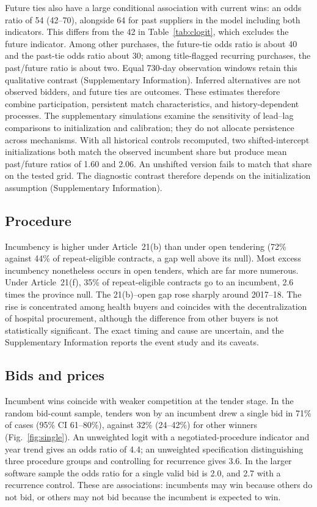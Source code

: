 \documentclass[pdflatex,sn-apa]{sn-jnl}
\begin{document}
Future ties also have a large conditional association with current wins: an odds ratio of 54 (42--70), alongside 64 for past suppliers in the model including both indicators. This differs from the 42 in Table~\ref{tab:clogit}, which excludes the future indicator. Among other purchases, the future-tie odds ratio is about 40 and the past-tie odds ratio about 30; among title-flagged recurring purchases, the past/future ratio is about two. Equal 730-day observation windows retain this qualitative contrast (Supplementary Information). Inferred alternatives are not observed bidders, and future ties are outcomes. These estimates therefore combine participation, persistent match characteristics, and history-dependent processes. The supplementary simulations examine the sensitivity of lead--lag comparisons to initialization and calibration; they do not allocate persistence across mechanisms. With all historical controls recomputed, two shifted-intercept initializations both match the observed incumbent share but produce mean past/future ratios of 1.60 and 2.06. An unshifted version fails to match that share on the tested grid. The diagnostic contrast therefore depends on the initialization assumption (Supplementary Information).

\subsection{Procedure}
Incumbency is higher under Article~21(b) than under open tendering (72\% against 44\% of repeat-eligible contracts, a gap well above its null). Most excess incumbency nonetheless occurs in open tenders, which are far more numerous. Under Article~21(f), 35\% of repeat-eligible contracts go to an incumbent, 2.6 times the province null. The 21(b)--open gap rose sharply around 2017--18. The rise is concentrated among health buyers and coincides with the decentralization of hospital procurement, although the difference from other buyers is not statistically significant. The exact timing and cause are uncertain, and the Supplementary Information reports the event study and its caveats.

\subsection{Bids and prices}
Incumbent wins coincide with weaker competition at the tender stage. In the random bid-count sample, tenders won by an incumbent drew a single bid in 71\% of cases (95\% CI 61--80\%), against 32\% (24--42\%) for other winners (Fig.~\ref{fig:single}). An unweighted logit with a negotiated-procedure indicator and year trend gives an odds ratio of 4.4; an unweighted specification distinguishing three procedure groups and controlling for recurrence gives 3.6. In the larger software sample the odds ratio for a single valid bid is 2.0, and 2.7 with a recurrence control. These are associations: incumbents may win because others do not bid, or others may not bid because the incumbent is expected to win.
\end{document}
